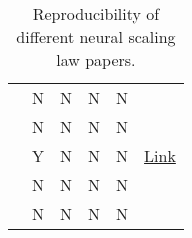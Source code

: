 \begin{table*}[htbp]
{\begin{tabular}{l c c c c c}
    \citet{frantar_scaling_2023} & N     & N     & N     & N     &  \\
    \citet{tay_scaling_2022} & N     & N     & N     & N     &  \\
    \citet{zhai_scaling_2022} & Y     & N     & N     & N     & \multicolumn{1}{l}{\href{https://github.com/google-research/big_vision}{Link}} \\
    \citet{hoffmann_training_2022} & N     & N     & N     & N     &  \\
    \citet{clark_unified_2022} & N     & N     & N     & N     &  \\
    \cline{1-6}
    \end{tabular}%
    }
  \label{tab:reproducibility}%
  \caption{Reproducibility of different neural scaling law papers.}
\end{table*}%
